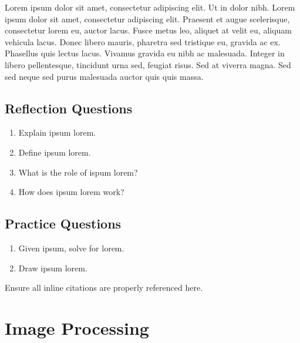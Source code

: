 \documentclass[
]{book}
\providecommand{\tightlist}{%
  \setlength{\itemsep}{0pt}\setlength{\parskip}{0pt}}
\begin{document}
Lorem ipsum dolor sit amet, consectetur adipiscing elit. Ut in dolor nibh. Lorem ipsum dolor sit amet, consectetur adipiscing elit. Praesent et augue scelerisque, consectetur lorem eu, auctor lacus. Fusce metus leo, aliquet at velit eu, aliquam vehicula lacus. Donec libero mauris, pharetra sed tristique eu, gravida ac ex. Phasellus quis lectus lacus. Vivamus gravida eu nibh ac malesuada. Integer in libero pellentesque, tincidunt urna sed, feugiat risus. Sed at viverra magna. Sed sed neque sed purus malesuada auctor quis quis massa.

\hypertarget{reflection-questions-9}{%
\section*{Reflection Questions}\label{reflection-questions-9}}

\begin{enumerate}
\def\labelenumi{\arabic{enumi}.}
\tightlist
\item
  Explain ipsum lorem.
\item
  Define ipsum lorem.
\item
  What is the role of ispum lorem?
\item
  How does ipsum lorem work?
\end{enumerate}

\hypertarget{practice-questions-7}{%
\section*{Practice Questions}\label{practice-questions-7}}

\begin{enumerate}
\def\labelenumi{\arabic{enumi}.}
\setcounter{enumi}{1}
\tightlist
\item
  Given ipsum, solve for lorem.
\item
  Draw ipsum lorem.
\end{enumerate}

Ensure all inline citations are properly referenced here.

\hypertarget{image-processing}{%
\chapter{Image Processing}\label{image-processing}}
\end{document}
